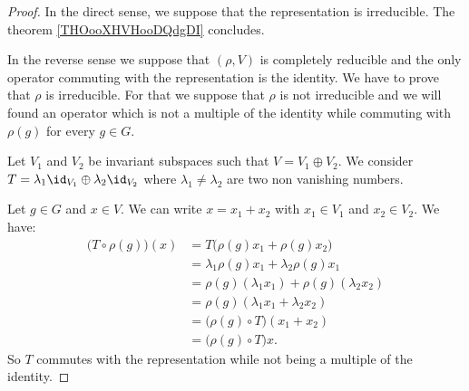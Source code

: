 \begin{proof}
    In the direct sense, we suppose that the representation is irreducible. The theorem \ref{THOooXHVHooDQdgDI} concludes.

    In the reverse sense we suppose that \( (\rho, V)\) is completely reducible and the only operator commuting with the representation is the identity. We have to prove that \( \rho\) is irreducible. For that we suppose that \( \rho\) is not irreducible and we will found an operator which is not a multiple of the identity while commuting with \( \rho(g)\) for every \( g\in G\).
    
    
    Let \( V_1\) and \( V_2\) be invariant subspaces such that \( V=V_1\oplus V_2\). We consider \( T=\lambda_1\id_{V_1}\oplus \lambda_2\id_{V_2}\) where \( \lambda_1\neq \lambda_2\) are two non vanishing numbers.

    Let \( g\in G\) and \( x\in V\). We can write \( x=x_1+x_2\) with \( x_1\in V_1\) and \( x_2\in V_2\). We have:
    \begin{subequations}
        \begin{align}
            \big( T\circ\rho(g) \big)(x)&=T\big( \rho(g)x_1+\rho(g)x_2 \big)\\
            &=\lambda_1\rho(g)x_1+\lambda_2\rho(g)x_1\\
            &=\rho(g)(\lambda_1x_1)+\rho(g)(\lambda_2x_2)\\
            &=\rho(g)(\lambda_1x_1+\lambda_2x_2)\\
            &=\big( \rho(g)\circ T \big)(x_1+x_2)\\
            &=\big( \rho(g)\circ T\big)x.
        \end{align}
    \end{subequations}
    So \( T\) commutes with the representation while not being a multiple of the identity.
\end{proof}
